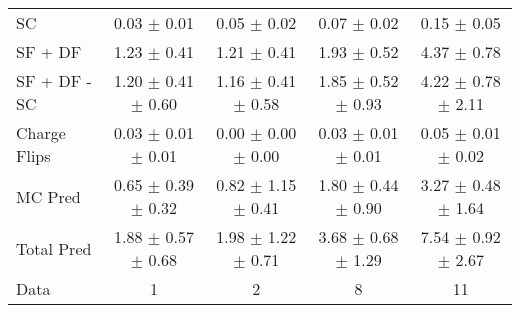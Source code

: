 \begin{tabular}{l|cccc}
                                 SC &  0.03 $\pm$  0.01 &  0.05 $\pm$  0.02 &  0.07 $\pm$  0.02 &  0.15 $\pm$  0.05 \\
                            SF + DF &  1.23 $\pm$  0.41 &  1.21 $\pm$  0.41 &  1.93 $\pm$  0.52 &  4.37 $\pm$  0.78 \\
\hline
                       SF + DF - SC &  1.20 $\pm$  0.41 $\pm$  0.60 &  1.16 $\pm$  0.41 $\pm$  0.58 &  1.85 $\pm$  0.52 $\pm$  0.93 &  4.22 $\pm$  0.78 $\pm$  2.11 \\
\hline\hline
                       Charge Flips &  0.03 $\pm$  0.01 $\pm$  0.01 &  0.00 $\pm$  0.00 $\pm$  0.00 &  0.03 $\pm$  0.01 $\pm$  0.01 &  0.05 $\pm$  0.01 $\pm$  0.02 \\
\hline
                            MC Pred &  0.65 $\pm$  0.39 $\pm$  0.32 &  0.82 $\pm$  1.15 $\pm$  0.41 &  1.80 $\pm$  0.44 $\pm$  0.90 &  3.27 $\pm$  0.48 $\pm$  1.64 \\
\hline
                         Total Pred &  1.88 $\pm$  0.57 $\pm$  0.68 &  1.98 $\pm$  1.22 $\pm$  0.71 &  3.68 $\pm$  0.68 $\pm$  1.29 &  7.54 $\pm$  0.92 $\pm$  2.67 \\
\hline\hline
                               Data &     1 &     2 &     8 &    11 \\
\hline\hline
\end{tabular}

